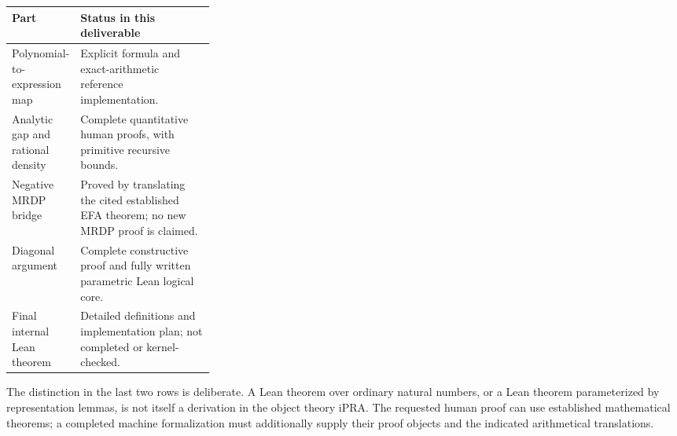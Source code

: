 \begin{center}
\begin{tabularx}{\linewidth}{@{}p{0.30\linewidth}X@{}}
\toprule
Part & Status in this deliverable\\
\midrule
Polynomial-to-expression map & Explicit formula and exact-arithmetic reference implementation.\\
Analytic gap and rational density & Complete quantitative human proofs, with primitive recursive bounds.\\
Negative MRDP bridge & Proved by translating the cited established EFA theorem; no new MRDP proof is claimed.\\
Diagonal argument & Complete constructive proof and fully written parametric Lean logical core.\\
Final internal Lean theorem & Detailed definitions and implementation plan; not completed or kernel-checked.\\
\bottomrule
\end{tabularx}
\end{center}

The distinction in the last two rows is deliberate. A Lean theorem over
ordinary natural numbers, or a Lean theorem parameterized by representation
lemmas, is not itself a derivation in the object theory iPRA. The requested
human proof can use established mathematical theorems; a completed machine
formalization must additionally supply their proof objects and the indicated
arithmetical translations.
